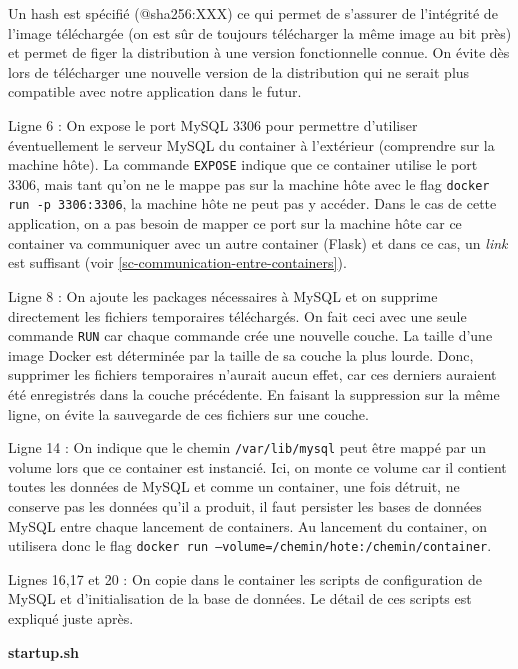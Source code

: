 \documentclass[11pt,a4paper,oneside]{report}
\newcommand{\code}[1]{\texttt{#1}}
\begin{document}
Un hash est spécifié (@sha256:XXX) ce qui permet de s'assurer de l'intégrité de l'image téléchargée (on est sûr de toujours télécharger la même image au bit près) et permet de figer la distribution à une version fonctionnelle connue. On évite dès lors de télécharger une nouvelle version de la distribution qui ne serait plus compatible avec notre application dans le futur.

Ligne 6 : On expose le port MySQL 3306 pour permettre d'utiliser éventuellement le serveur MySQL du container à l'extérieur (comprendre sur la machine hôte). La commande \code{EXPOSE} indique que ce container utilise le port 3306, mais tant qu'on ne le mappe pas sur la machine hôte avec le flag \code{docker run -p 3306:3306}, la machine hôte ne peut pas y accéder. Dans le cas de cette application, on a pas besoin de mapper ce port sur la machine hôte car ce container va communiquer avec un autre container (Flask) et dans ce cas, un \textit{link} est suffisant (voir \ref{sc-communication-entre-containers}).

Ligne 8 : On ajoute les packages nécessaires à MySQL et on supprime directement les fichiers temporaires téléchargés. On fait ceci avec une seule commande \code{RUN} car chaque commande crée une nouvelle couche. La taille d'une image Docker est déterminée par la taille de sa couche la plus lourde. Donc, supprimer les fichiers temporaires n'aurait aucun effet, car ces derniers auraient été enregistrés dans la couche précédente. En faisant la suppression sur la même ligne, on évite la sauvegarde de ces fichiers sur une couche.

Ligne 14 : On indique que le chemin \code{/var/lib/mysql} peut être mappé par un volume lors que ce container est instancié. Ici, on monte ce volume car il contient toutes les données de MySQL et comme un container, une fois détruit, ne conserve pas les données qu'il a produit, il faut persister les bases de données MySQL entre chaque lancement de containers. Au lancement du container, on utilisera donc le flag \code{docker run --volume=/chemin/hote:/chemin/container}.

Lignes 16,17 et 20 : On copie dans le container les scripts de configuration de MySQL et d'initialisation de la base de données. Le détail de ces scripts est expliqué juste après.


\textbf{startup.sh}
\end{document}
